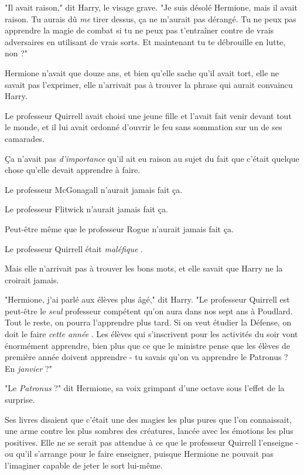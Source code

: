 "Il avait raison," dit Harry, le visage grave. "Je suis désolé Hermione, mais il avait raison. Tu aurais dû \emph{me}  tirer dessus, ça ne m'aurait pas dérangé. Tu ne peux pas apprendre la magie de combat si tu ne peux pas t'entraîner contre de vrais adversaires en utilisant de vrais sorts. Et maintenant tu te débrouille en lutte, non ?"

Hermione n'avait que douze ans, et bien qu'elle sache qu'il avait tort, elle ne savait pas l'exprimer, elle n'arrivait pas à trouver la phrase qui aurait convaincu Harry.

Le professeur Quirrell avait choisi une jeune fille et l'avait fait venir devant tout le monde, et il lui avait ordonné d'ouvrir le feu sans sommation sur un de ses camarades.

Ça n'avait pas \emph{d'importance}  qu'il ait eu raison au sujet du fait que c'était quelque chose qu'elle devait apprendre à faire.

Le professeur McGonagall n'aurait jamais fait ça.

Le professeur Flitwick n'aurait jamais fait ça.

Peut-être même que le professeur Rogue n'aurait jamais fait ça.

Le professeur Quirrell était \emph{maléfique} .

Mais elle n'arrivait pas à trouver les bons mots, et elle savait que Harry ne la croirait jamais.

"Hermione, j'ai parlé aux élèves plus âgé," dit Harry. "Le professeur Quirrell est peut-être le \emph{seul}  professeur compétent qu'on aura dans nos sept ans à Poudlard. Tout le reste, on pourra l'apprendre plus tard. Si on veut étudier la Défense, on doit le faire \emph{cette année} . Les élèves qui s'inscrivent pour les activités du soir vont énormément apprendre, bien plus que ce que le ministre pense que les élèves de première année doivent apprendre - tu savais qu'on va apprendre le Patronus ? En \emph{janvier}  ?"

"Le \emph{Patronus}  ?" dit Hermione, sa voix grimpant d'une octave sous l'effet de la surprise.

Ses livres disaient que c'était une des magies les plus pures que l'on connaissait, une arme contre les plus sombres des créatures, lancée avec les émotions les plus positives. Elle ne se serait pas attendue à ce que le professeur Quirrell l'enseigne - ou qu'il s'arrange pour le faire enseigner, puisque Hermione ne pouvait pas l'imaginer capable de jeter le sort lui-même.

